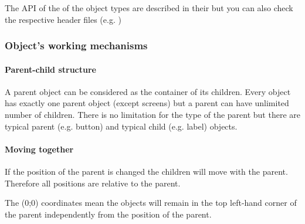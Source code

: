 \documentclass[letterpaper,10pt,english]{sphinxmanual}
\begin{document}
The API of the of the object types are described in their {\hyperref[\detokenize{object-types/index::doc}]{}} but you can also check the respective header files (e.g. )


\subsubsection{Object’s working mechanisms}
\label{\detokenize{overview/objects:object-s-working-mechanisms}}

\paragraph{Parent-child structure}
\label{\detokenize{overview/objects:parent-child-structure}}
A parent object can be considered as the container of its children. Every object has exactly one parent object (except screens) but a parent can have unlimited number of children.
There is no limitation for the type of the parent but there are typical parent (e.g. button) and typical child (e.g. label) objects.


\paragraph{Moving together}
\label{\detokenize{overview/objects:moving-together}}
If the position of the parent is changed the children will move with the parent.
Therefore all positions are relative to the parent.

The (0;0) coordinates mean the objects will remain in the top left-hand corner of the parent independently from the position of the parent.


\begin{sphinxVerbatim}[commandchars=\\\{\}]
      
  	                   

     	         
  	                   
\end{sphinxVerbatim}
\end{document}
